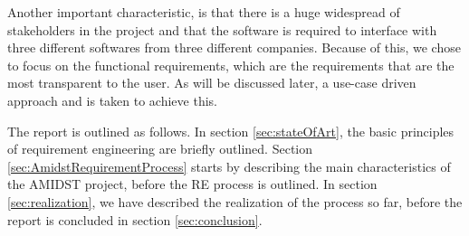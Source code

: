 Another important characteristic, is that there is a huge widespread of stakeholders in the project and that the software is required to interface with three different softwares from three different companies.  Because of this, we chose to focus on the functional requirements, which are the requirements that are the most transparent to the user.  As will be discussed later, a use-case driven approach \cite{Poh10} and \cite{Coc01} is taken to achieve this.

The report is outlined as follows.  In section \ref{sec:stateOfArt}, the basic principles of requirement engineering are briefly outlined.  Section \ref{sec:AmidstRequirementProcess} starts by describing the main characteristics of the AMIDST project, before the RE process is outlined.  In section \ref{sec:realization}, we have described the realization of the process so far, before the report is concluded in section \ref{sec:conclusion}.
